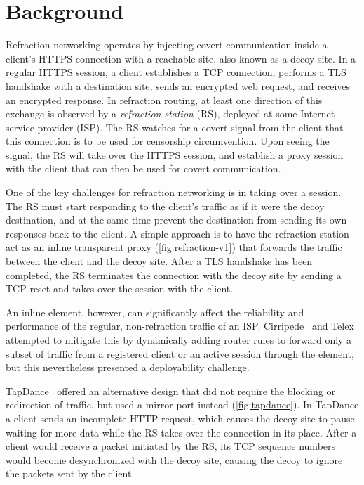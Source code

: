 \section{Background}

Refraction networking operates by injecting covert communication inside a
client's HTTPS connection with a reachable site, also known as a decoy site. In
a regular HTTPS session, a client establishes a TCP connection, performs a TLS
handshake with a destination site, sends an encrypted web request, and
receives an encrypted response. In refraction routing, at least one direction
of this exchange is observed by a \emph{refraction station} (RS), deployed at
some Internet service provider (ISP). The RS watches for a covert signal from
the client that this connection is to be used for censorship circumvention.
Upon seeing the signal, the RS will take over the HTTPS session,
and establish a proxy session with the client that can then be used for covert
communication.

\FigEvolution

One of the key challenges for refraction networking is in taking over a session. The RS must start responding to the client's traffic as if it were the decoy destination, and at the same time prevent the destination from sending its own responses back to the client. A simple approach is to have the refraction station act as an inline transparent proxy (\cref{fig:refraction-v1}) that forwards the traffic between the client and the decoy site. After a TLS handshake has been completed, the RS terminates the connection with the decoy site by sending a TCP reset and takes over the session with the client.

An inline element, however, can significantly affect the reliability and performance of the regular, non-refraction traffic of an ISP. Cirripede~\cite{cirripede11} and Telex~\cite{telex11} attempted to mitigate this by dynamically adding router rules to forward only a subset of traffic from a registered client or an active session through the element, but this nevertheless presented a deployability challenge.

TapDance~\cite{tapdance14} offered an alternative design that did not require the blocking or redirection of traffic, but used a mirror port instead (\cref{fig:tapdance}). In TapDance a client sends an incomplete HTTP request, which causes the decoy site to pause waiting for more data while the RS takes over the connection in its place. After a client would receive a packet initiated by the RS, its TCP sequence numbers would become desynchronized with the decoy site, causing the decoy to ignore the packets sent by the client.

